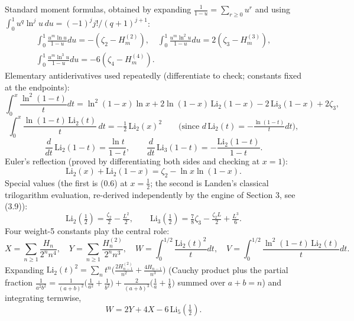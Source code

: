 \documentclass[11pt]{article}
\theoremstyle{remark}
\begin{document}
Standard moment formulas, obtained by expanding $\frac1{1-u}=\sum_{r\ge0}u^r$ and using $\int_0^1u^{q}\ln^ju\,du=(-1)^j j!/(q+1)^{j+1}$:
\begin{equation*}
\begin{gathered}
\int_0^1\frac{u^m\ln u}{1-u}du=-(\zeta_2-H_m^{(2)}),\quad
\int_0^1\frac{u^m\ln^2 u}{1-u}du=2(\zeta_3-H_m^{(3)}),\\
\int_0^1\frac{u^m\ln^3 u}{1-u}du=-6(\zeta_4-H_m^{(4)}).
\end{gathered} \tag{0.2}
\end{equation*}
Elementary antiderivatives used repeatedly (differentiate to check; constants fixed at the endpoints):
\begin{equation*}
\int_0^x\frac{\ln^2(1-t)}{t}dt=\ln^2(1-x)\ln x+2\ln(1-x)\,\mathrm{Li}_2(1-x)-2\,\mathrm{Li}_3(1-x)+2\zeta_3, \tag{0.3}
\end{equation*}
\begin{equation*}
\int_0^x\frac{\ln(1-t)\,\mathrm{Li}_2(t)}{t}\,dt=-\tfrac12\,\mathrm{Li}_2(x)^2\qquad\Big(\text{since }d\,\mathrm{Li}_2(t)=-\tfrac{\ln(1-t)}{t}dt\Big), \tag{0.4}
\end{equation*}
\begin{equation*}
\frac{d}{dt}\,\mathrm{Li}_2(1-t)=\frac{\ln t}{1-t},\qquad
\frac{d}{dt}\,\mathrm{Li}_3(1-t)=-\frac{\mathrm{Li}_2(1-t)}{1-t}. \tag{0.5}
\end{equation*}
Euler's reflection (proved by differentiating both sides and checking at $x=1$):
\begin{equation*}
\mathrm{Li}_2(x)+\mathrm{Li}_2(1-x)=\zeta_2-\ln x\ln(1-x). \tag{0.6}
\end{equation*}
Special values (the first is (0.6) at $x=\frac12$; the second is Landen's classical trilogarithm evaluation, re-derived independently by the engine of Section 3, see (3.9)):
\begin{equation*}
\mathrm{Li}_2(\tfrac12)=\tfrac{\zeta_2}{2}-\tfrac{L^2}{2},\qquad
\mathrm{Li}_3(\tfrac12)=\tfrac78\zeta_3-\tfrac{\zeta_2L}{2}+\tfrac{L^3}{6}. \tag{0.7}
\end{equation*}
Four weight-5 constants play the central role:
\begin{equation*}
X=\sum_{n\ge1}\frac{H_n}{2^nn^4},\quad
Y=\sum_{n\ge1}\frac{H_n^{(2)}}{2^nn^3},\quad
W=\int_0^{1/2}\frac{\mathrm{Li}_2(t)^2}{t}dt,\quad
V=\int_0^{1/2}\frac{\ln^2(1-t)\,\mathrm{Li}_2(t)}{t}dt. \tag{0.8}
\end{equation*}
Expanding $\mathrm{Li}_2(t)^2=\sum_n t^n\big(\tfrac{2H^{(2)}_{n-1}}{n^2}+\tfrac{4H_{n-1}}{n^3}\big)$ (Cauchy product plus the partial fraction
$\frac1{a^2b^2}=\frac1{(a+b)^2}\big(\frac1{a^2}+\frac1{b^2}\big)+\frac2{(a+b)^3}\big(\frac1a+\frac1b\big)$ summed over $a+b=n$) and integrating termwise,
\begin{equation*}
W=2Y+4X-6\,\mathrm{Li}_5(\tfrac12). \tag{0.9}
\end{equation*}
\end{document}
